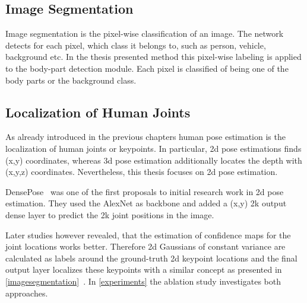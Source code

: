 \subsection{Image Segmentation}
\label{imagesegmentation}
Image segmentation is the pixel-wise classification of an image.
The network detects for each pixel, which class it belongs to, such as person, vehicle, background etc.
In the thesis presented method this pixel-wise labeling is applied to the body-part detection module.
Each pixel is classified of being one of the body parts or the background class.
%

\subsection{Localization of Human Joints}
As already introduced in the previous chapters human pose estimation is the localization of human joints or keypoints.
In particular, 2d pose estimations finds (x,y) coordinates, whereas 3d pose estimation additionally locates the depth with
(x,y,z) coordinates.
Nevertheless, this thesis focuses on 2d pose estimation.

DensePose~\cite{DensePose} was one of the first proposals to initial research work in 2d pose estimation.
They used the AlexNet as backbone and added a (x,y) 2k output dense layer to predict the 2k joint positions in the image.

Later studies however revealed, that the estimation of confidence maps for the joint locations works better.
Therefore 2d Gaussians of constant variance are calculated as labels around the ground-truth 2d keypoint locations
and the final output layer localizes these keypoints
with a similar concept as presented in \autoref{imagesegmentation}~\cite{humanpose2dguide}.
In \autoref{experiments} the ablation study investigates both approaches.





